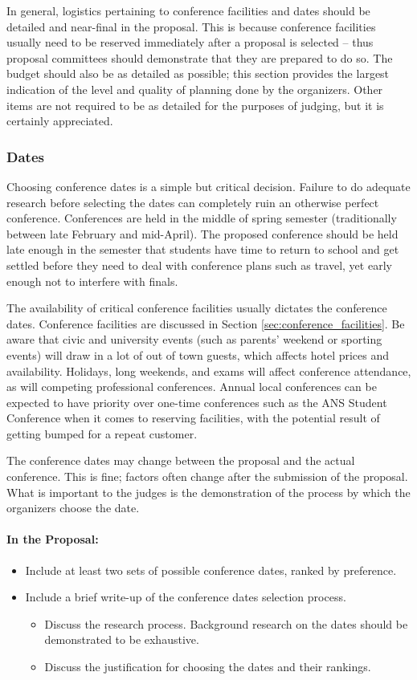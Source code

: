 \documentclass[12pt]{article}
\begin{document}
In general, logistics pertaining to conference facilities and dates should be detailed and
near-final in the proposal. This is because conference facilities usually need to be
reserved immediately after a proposal is selected – thus proposal committees should demonstrate that they are
prepared to do so. The budget should also be as detailed as possible; this section
provides the largest indication of the level and quality of planning done by the organizers.
Other items are not required to be as detailed for the purposes of judging, but it is
certainly appreciated.

\subsubsection{Dates}
Choosing conference dates is a simple but critical decision. Failure to do adequate
research before selecting the dates can completely ruin an otherwise perfect conference.
Conferences are held in the middle of spring semester (traditionally between late
February and mid-April). The proposed conference should be held late enough in the
semester that students have time to return to school and get settled before they need to
deal with conference plans such as travel, yet early enough not to interfere with finals.


The availability of critical conference facilities usually dictates the conference dates. Conference facilities are discussed in Section \ref{sec:conference_facilities}.
Be aware that civic and university events (such as parents’ weekend or sporting events)
will draw in a lot of out of town guests, which affects hotel prices and availability.
Holidays, long weekends, and exams will affect conference attendance, as will competing
professional conferences. Annual local conferences can be expected to have priority over
one-time conferences such as the ANS Student Conference when it comes to reserving
facilities, with the potential result of getting bumped for a repeat customer.

The conference dates may change between the proposal and the actual conference. This
is fine; factors often change after the submission of the proposal. What is important to
the judges is the demonstration of the process by which the organizers choose the date.

\paragraph{In the Proposal:}
\begin{itemize}
\item{Include at least two sets of possible conference dates, ranked by preference.}
\item{Include a brief write-up of the conference dates selection process.
\begin{itemize}
\item{Discuss the research process. Background research on the dates should be demonstrated to be exhaustive.}
\item{Discuss the justification for choosing the dates and their rankings.}
\end{itemize}
}
\end{itemize}
\end{document}
